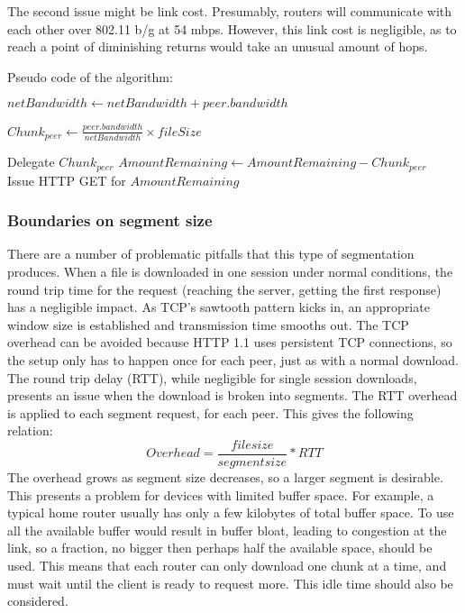\documentclass[12pt]{article}
\begin{document}
			The second issue might be link cost. Presumably, routers will communicate with each other over 802.11 b/g at 54 mbps. However, this link cost is negligible, as to reach a point of diminishing returns would take an unusual amount of hops.

			Pseudo code of the algorithm:

			\begin{algorithmic}
					\State $netBandwidth\gets netBandwidth + peer.bandwidth$
				\EndFor

					\State $Chunk_{peer} \gets \frac{peer.bandwidth}{netBandwidth} \times{fileSize}$
				\EndFor

					Delegate $Chunk_{peer}$
					\State $AmountRemaining \gets AmountRemaining - Chunk_{peer}$
				\EndFor\\
				Issue HTTP GET for $AmountRemaining$
			\end{algorithmic}

		\subsubsection{Boundaries on segment size}

			There are a number of problematic pitfalls that this type of segmentation produces. When a file is downloaded in one session under normal conditions, the round trip time for the request (reaching the server, getting the first response) has a negligible impact. As TCP's sawtooth pattern kicks in, an appropriate window size is established and transmission time smooths out. The TCP overhead can be avoided because HTTP 1.1 uses persistent TCP connections, so the setup only has to happen once for each peer, just as with a normal download.\\

			The round trip delay (RTT), while negligible for single session downloads, presents an issue when the download is broken into segments. The RTT overhead is applied to each segment request, for each peer. This gives the following relation:
			$$Overhead = \frac{file size}{segment size} * RTT$$
			The overhead grows as segment size decreases, so a larger segment is desirable. This presents a problem for devices with limited buffer space. For example, a typical home router usually has only a few kilobytes of total buffer space. To use all the available buffer would result in buffer bloat, leading to congestion at the link, so a fraction, no bigger then perhaps half the available space, should be used. This means that each router can only download one chunk at a time, and must wait until the client is ready to request more. This idle time should also be considered.
\end{document}
